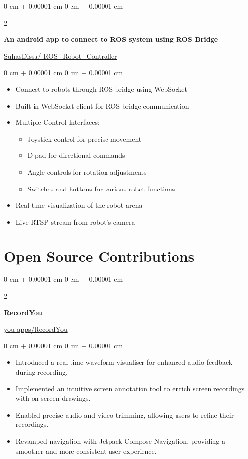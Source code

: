 \documentclass[10pt, letterpaper]{article}
\newenvironment{highlights}{
	\begin{itemize}[
		topsep=0.10 cm,
		parsep=0.10 cm,
		partopsep=0pt,
		itemsep=0pt,
		leftmargin=0 cm + 10pt
		]
	}{
	\end{itemize}
} %
\newenvironment{onecolentry}{
	\begin{adjustwidth}{
			0 cm + 0.00001 cm
		}{
			0 cm + 0.00001 cm
		}
	}{
	\end{adjustwidth}
} %
\newenvironment{twocolentry}[2][]{
	\onecolentry
	\def\secondColumn{#2}
	\setcolumnwidth{\fill, 4.5 cm}
	\begin{paracol}{2}
	}{
		\switchcolumn \raggedleft \secondColumn
	\end{paracol}
	\endonecolentry
} %
\begin{document}
	\begin{twocolentry}{\href{https://github.com/SuhasDissa/ROS_Robot_Controller}{SuhasDissa/ ROS\_Robot\_Controller}}
		\textbf{An android app to connect to ROS system using ROS Bridge}
	\end{twocolentry}
	\vspace{0.10 cm}
	\begin{onecolentry}
		\begin{highlights}
			\item Connect to robots through ROS bridge using WebSocket
			\item Built-in WebSocket client for ROS bridge communication
			\item Multiple Control Interfaces:
			\begin{itemize}
				\item Joystick control for precise movement
				\item D-pad for directional commands
				\item Angle controls for rotation adjustments
				\item Switches and buttons for various robot functions
			\end{itemize}
			\item Real-time visualization of the robot arena
			\item Live RTSP stream from robot's camera
		\end{highlights}
	\end{onecolentry}
	
	\section{Open Source Contributions}
	\begin{twocolentry}{\href{https://github.com/you-apps/RecordYou}{you-apps/RecordYou}}
		\textbf{RecordYou}
	\end{twocolentry}
	\vspace{0.10 cm}
	\begin{onecolentry}
		\begin{highlights}
			\item Introduced a real-time waveform visualiser for enhanced audio feedback during recording.
			\item Implemented an intuitive screen annotation tool to enrich screen recordings with on-screen drawings.
			\item Enabled precise audio and video trimming, allowing users to refine their recordings.
			\item Revamped navigation with Jetpack Compose Navigation, providing a smoother and more consistent user experience.
		\end{highlights}
	\end{onecolentry}
	
\end{document}
